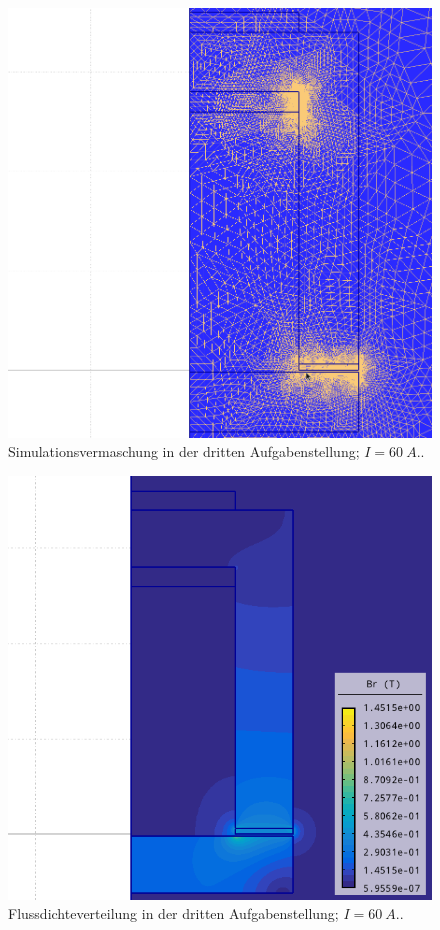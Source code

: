 \documentclass[conference,a4paper,twoside]{IEEEtran}
\begin{document}
\begin{figure}
\centerline{\includegraphics[width=0.7\columnwidth]{../assets/assignment_3_mesh.png}}
\caption{Simulationsvermaschung in der dritten Aufgabenstellung; $I = 60\ A$..}
\label{assignment_3_mesh}
\end{figure}

\begin{figure}
\centerline{\includegraphics[width=0.7\columnwidth]{../assets/assignment_3_simulation.png}}
\caption{Flussdichteverteilung in der dritten Aufgabenstellung; $I = 60\ A$..}
\label{assignment_3_simulation}
\end{figure}
\end{document}
